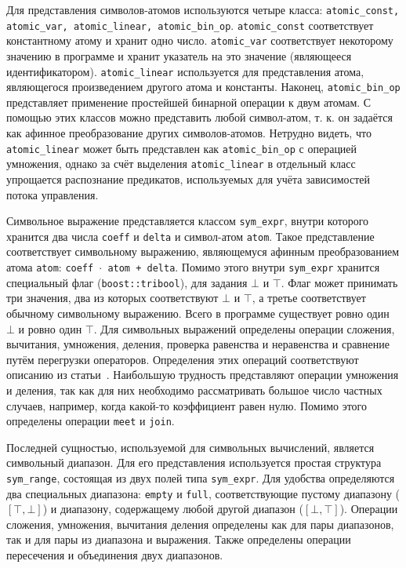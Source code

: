 Для представления символов-атомов используются четыре класса:
\texttt{atomic\_const, atomic\_var, atomic\_linear,
  atomic\_bin\_op}. \texttt{atomic\_const} соответствует константному
атому и хранит одно число. \texttt{atomic\_var} соответствует
некоторому значению в программе и хранит указатель на это значение
(являющееся идентификатором). \texttt{atomic\_linear} используется для
представления атома, являющегося произведением другого атома и
константы. Наконец, \texttt{atomic\_bin\_op} представляет применение
простейшей бинарной операции к двум атомам. С помощью этих классов
можно представить любой символ-атом, т. к. он задаётся как афинное
преобразование других символов-атомов. Нетрудно видеть, что
\texttt{atomic\_linear} может быть представлен как
\texttt{atomic\_bin\_op} с операцией умножения, однако за счёт выделения
\texttt{atomic\_linear} в отдельный класс упрощается распознание
предикатов, используемых для учёта зависимостей потока управления.

Символьное выражение представляется классом \texttt{sym\_expr}, внутри
которого хранится два числа \texttt{coeff} и \texttt{delta} и
символ-атом \texttt{atom}. Такое представление соответствует
символьному выражению, являющемуся афинным преобразованием атома
\texttt{atom}: \texttt{coeff $\cdot$ atom + delta}. Помимо этого
внутри \texttt{sym\_expr} хранится специальный флаг
(\texttt{boost::tribool}), для задания $\bot$ и $\top$. Флаг может
принимать три значения, два из которых соответствуют $\bot$ и $\top$,
а третье соответствует обычному символьному выражению. Всего в
программе существует ровно один $\bot$ и ровно один $\top$. Для
символьных выражений определены операции сложения, вычитания,
умножения, деления, проверка равенства и неравенства и сравнение путём
перегрузки операторов. Определения этих операций соответствуют
описанию из статьи~\cite{li2010practical}. Наибольшую трудность
представляют операции умножения и деления, так как для них необходимо
рассматривать большое число частных случаев, например, когда какой-то
коэффициент равен нулю. Помимо этого определены операции \texttt{meet}
и \texttt{join}.

Последней сущностью, используемой для символьных вычислений, является
символьный диапазон. Для его представления используется простая
структура \texttt{sym\_range}, состоящая из двух полей типа
\texttt{sym\_expr}. Для удобства определяются два специальных
диапазона: \texttt{empty} и \texttt{full}, соответствующие пустому
диапазону ($[\top, \bot]$) и диапазону, содержащему любой другой
диапазон ($[\bot, \top]$). Операции сложения, умножения, вычитания
деления определены как для пары диапазонов, так и для пары из
диапазона и выражения. Также определены операции пересечения и
объединения двух диапазонов.

